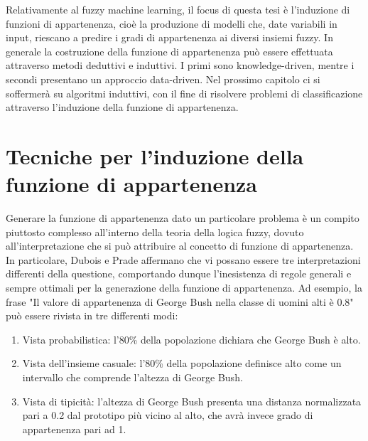 \documentclass[11pt]{article}
\begin{document}
Relativamente al fuzzy machine learning, il focus di questa tesi è l'induzione di funzioni di appartenenza, cioè la produzione di modelli che, date variabili in input, riescano a predire i gradi di appartenenza ai diversi insiemi fuzzy. In generale la costruzione della funzione di appartenenza può essere effettuata attraverso metodi deduttivi e induttivi. I primi sono knowledge-driven, mentre i secondi presentano un approccio data-driven. Nel prossimo capitolo ci si soffermerà su algoritmi induttivi, con il fine di risolvere problemi di classificazione attraverso l'induzione della funzione di appartenenza. 


	\newpage
	\section{Tecniche per l'induzione della funzione di appartenenza}

Generare la funzione di appartenenza dato un particolare problema è un compito piuttosto complesso all'interno della teoria della logica fuzzy, dovuto all'interpretazione che si può attribuire al concetto di funzione di appartenenza. In particolare, Dubois e Prade\cite{membinterp} affermano che vi possano essere tre interpretazioni differenti della questione, comportando dunque l'inesistenza di regole generali e sempre ottimali per la generazione della funzione di appartenenza. Ad esempio, la frase "Il valore di appartenenza di George Bush nella classe di uomini alti è 0.8"\cite{membpaper} può essere rivista in tre differenti modi:

\begin{enumerate}
\item Vista probabilistica: l'80\% della popolazione dichiara che George Bush è alto.
\item Vista dell'insieme casuale: l'80\% della popolazione definisce alto come un intervallo che comprende l'altezza di George Bush.
\item Vista di tipicità: l'altezza di George Bush presenta una distanza normalizzata pari a 0.2 dal prototipo più vicino al alto, che avrà invece grado di appartenenza pari ad 1. 
\end{enumerate}
\end{document}
